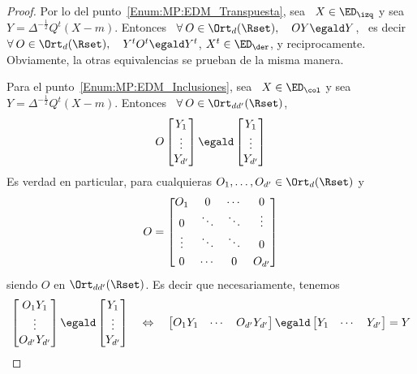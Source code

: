 \begin{proof}
%
  Por lo del punto~\ref{Enum:MP:EDM_Transpuesta}, sea \ $X \in \ED_\izq$ y sea \
  $Y  =   \Delta^{-\frac12}  Q^t   (X-m)$.   Entonces  \   $\forall  \:   O  \in
  \Ort_d(\Rset),  \quad  O   Y  \egald  Y$,  \  es  decir   $\forall  \:  O  \in
  \Ort_d(\Rset),  \quad  Y^t  O^t  \egald   Y^t$,  \ie  $X^t  \in  \ED_\der$,  y
  reciprocamente.   Obviamente, la otras  equivalencias se  prueban de  la misma
  manera.

  Para el punto~\ref{Enum:MP:EDM_Inclusiones}, sea \ $X \in \ED_\col$ y sea \ $Y
  =   \Delta^{-\frac12}   Q^t   (X-m)$.    Entonces   \  $\forall   \:   O   \in
  \Ort_{dd'}(\Rset)$,
  \[
  O \begin{bmatrix}  Y_1\\ \vdots\\ Y_{d'}  \end{bmatrix} \egald \begin{bmatrix}
    Y_1 \\ \vdots \\ Y_{d'} \end{bmatrix}
  \]
  Es  verdad  en  particular,  para   cualquieras  $O_1,  \ldots  ,  O_{d'}  \in
  \Ort_d(\Rset)$ y
  \[
  O = \begin{bmatrix}  O_1 & 0 & \cdots &  0 \\ 0 & \ddots &  \ddots & \vdots \\
    \vdots  &   \ddots  &  \ddots  &  \vspace{1mm}   0\\  0  &  \cdots   &  0  &
    O_{d'}\end{bmatrix}
  \]
  siendo $O$ en $\Ort_{dd'}(\Rset)$. Es decir que necesariamente, tenemos
  \[
  \begin{bmatrix}    O_1   Y_1\\    \vdots\\    O_{d'}   Y_{d'}    \end{bmatrix}
  \egald   \begin{bmatrix}  Y_1   \\  \vdots   \\  Y_{d'}   \end{bmatrix}  \quad
  \Leftrightarrow   \quad    \begin{bmatrix}   O_1   Y_1&    \cdots   &   O_{d'}
    Y_{d'}    \end{bmatrix}   \egald    \begin{bmatrix}   Y_1    &    \cdots   &
    Y_{d'} \end{bmatrix} = Y
\]
\end{proof}
